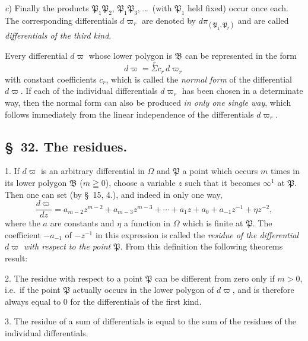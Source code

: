 \documentclass{article}
\begin{document}
\emph{c}) Finally the products $\mathfrak{P}_{1}\mathfrak{P}_{2}$, $\mathfrak{P}_{1}\mathfrak{P}_{3}$, \ldots\ (with $\mathfrak{P}_{1}$ held fixed) occur once each. The corresponding differentials $d\varpi_{r}$ are denoted by $d\pi_{(\mathfrak{P}_{1}, \mathfrak{P}_{r})}$ and are called \emph{differentials of the third kind}.

Every differential $d\varpi$ whose lower polygon is $\mathfrak{B}$ can be represented in the form
\[ d\varpi = \overset{r}{\Sigma} c_{r}\,d\varpi_{r} \tag{3.} \]
with constant coefficients $c_{r}$, which is called the \emph{normal form} of the differential $d\varpi$. If each of the individual differentials $d\varpi_{r}$ has been chosen in a determinate way, then the normal form can also be produced \emph{in only one single way}, which follows immediately from the linear independence of the differentials $d\varpi_{r}$.

\subsection*{§~32. The residues.}

1. If $d\varpi$ is an arbitrary differential in $\Omega$ and $\mathfrak{P}$ a point which occurs $m$ times in its lower polygon $\mathfrak{B}$ ($m \geqq 0$), choose a variable $z$ such that it becomes $\infty^{1}$ at $\mathfrak{P}$. Then one can set (by §~15, 4.), and indeed in only one way,
\[ \frac{d\varpi}{dz} = a_{m-2}z^{m-2}+a_{m-3}z^{m-3}+\cdots+a_{1}z+a_{0}+a_{-1}z^{-1}+\eta z^{-2}, \tag{1.} \]
where the $a$ are constants and $\eta$ a function in $\Omega$ which is finite at $\mathfrak{P}$. The coefficient $-a_{-1}$ of $-z^{-1}$ in this expression is called the \emph{residue of the differential $d\varpi$ with respect to the point $\mathfrak{P}$}. From this definition the following theorems result:


2. The residue with respect to a point $\mathfrak{P}$ can be different from zero only if $m > 0$, i.e.\ if the point $\mathfrak{P}$ actually occurs in the lower polygon of $d\varpi$, and is therefore always equal to 0 for the differentials of the first kind.

3. The residue of a sum of differentials is equal to the sum of the residues of the individual differentials.
\end{document}
